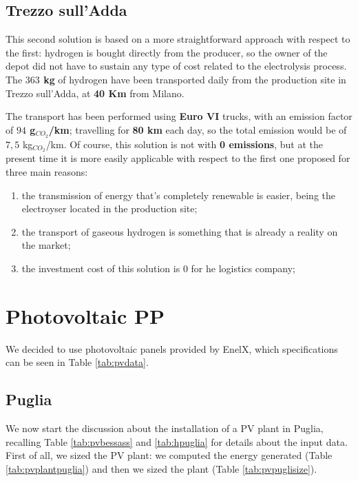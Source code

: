 

\subsection{Trezzo sull'Adda}
This second solution is based on a more straightforward approach with respect to the first: hydrogen is bought directly from the producer, so the owner of the depot did not have to sustain any type of cost related to the electrolysis process. The \textbf{$363$ kg} of hydrogen have been transported daily from the production site in Trezzo sull'Adda, at \textbf{ 40 Km} from Milano.

The transport has been performed using \textbf{Euro VI} trucks, with an emission factor of \textbf{$94$ g$_{CO_2}$/km}; travelling for \textbf{80 km} each day, so the total emission would be of $7,5$ kg$_{CO_2}$/km. Of course, this solution is not with \textbf{0 emissions}, but at the present time it is more easily applicable with respect to the first one proposed for three main reasons:

\begin{enumerate}
\item the transmission of energy that's completely renewable is easier, being the electroyser located in the production site;
\item the transport of gaseous hydrogen is something that is already a reality on the market;
\item the investment cost of this solution is 0 for he logistics company;
\end{enumerate}

\section{Photovoltaic PP}
We decided to use photovoltaic panels provided by EnelX, which specifications can be seen in Table \ref{tab:pvdata}.



\subsection{Puglia}
We now start the discussion about the installation of a PV plant in Puglia, recalling Table \ref{tab:pvbessass} and \ref{tab:hpuglia} for details about the input data. 
First of all, we sized the PV plant: we computed the energy generated (Table \ref{tab:pvplantpuglia}) and then we sized the plant (Table \ref{tab:pvpuglisize}).

